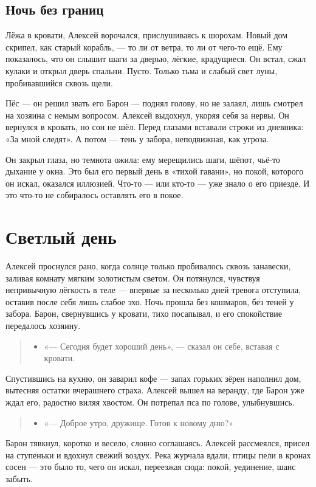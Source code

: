 \documentclass[12pt,a4paper]{book}
\newenvironment{dialogue}{\begin{quote}\itshape\begin{itemize}\item[]}{\end{itemize}\end{quote}}
\begin{document}
\section{Ночь без границ}

Лёжа в кровати, Алексей ворочался, прислушиваясь к шорохам. Новый дом скрипел, как старый корабль, — то ли от ветра, то ли от чего-то ещё. Ему показалось, что он слышит шаги за дверью, лёгкие, крадущиеся. Он встал, сжал кулаки и открыл дверь спальни. Пусто. Только тьма и слабый свет луны, пробивавшийся сквозь щели.

Пёс — он решил звать его Барон — поднял голову, но не залаял, лишь смотрел на хозяина с немым вопросом. Алексей выдохнул, укоряя себя за нервы. Он вернулся в кровать, но сон не шёл. Перед глазами вставали строки из дневника: «За мной следят». А потом — тень у забора, неподвижная, как угроза.

Он закрыл глаза, но темнота ожила: ему мерещились шаги, шёпот, чьё-то дыхание у окна. Это был его первый день в «тихой гавани», но покой, которого он искал, оказался иллюзией. Что-то — или кто-то — уже знало о его приезде. И это что-то не собиралось оставлять его в покое.

\chapter{Светлый день}

Алексей проснулся рано, когда солнце только пробивалось сквозь занавески, заливая комнату мягким золотистым светом. Он потянулся, чувствуя непривычную лёгкость в теле — впервые за несколько дней тревога отступила, оставив после себя лишь слабое эхо. Ночь прошла без кошмаров, без теней у забора. Барон, свернувшись у кровати, тихо посапывал, и его спокойствие передалось хозяину.

\begin{dialogue}
«— Сегодня будет хороший день», — сказал он себе, вставая с кровати.
\end{dialogue}

Спустившись на кухню, он заварил кофе — запах горьких зёрен наполнил дом, вытесняя остатки вчерашнего страха. Алексей вышел на веранду, где Барон уже ждал его, радостно виляя хвостом. Он потрепал пса по голове, улыбнувшись.

\begin{dialogue}
«— Доброе утро, дружище. Готов к новому дню?»
\end{dialogue}

Барон тявкнул, коротко и весело, словно соглашаясь. Алексей рассмеялся, присел на ступеньки и вдохнул свежий воздух. Река журчала вдали, птицы пели в кронах сосен — это было то, чего он искал, переезжая сюда: покой, уединение, шанс забыть.
\end{document}
